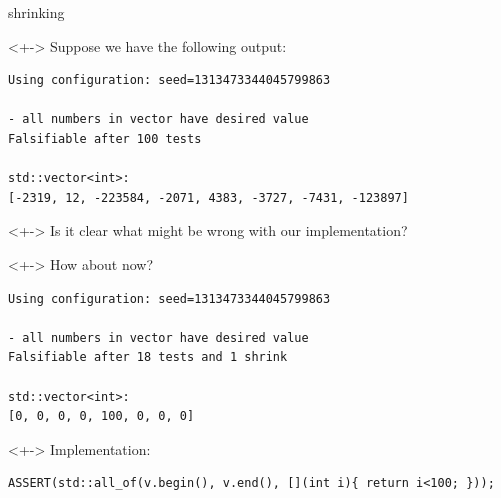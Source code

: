 \documentclass{beamer}
\begin{document}



\begin{frame}[fragile]{shrinking}

\begin{uncoverenv}<+->
Suppose we have the following output:
\begin{lstlisting}[style=shell]
Using configuration: seed=1313473344045799863

- all numbers in vector have desired value
Falsifiable after 100 tests

std::vector<int>:
[-2319, 12, -223584, -2071, 4383, -3727, -7431, -123897]
\end{lstlisting}
\end{uncoverenv}

\begin{uncoverenv}<+->
Is it clear what might be wrong with our implementation?
\end{uncoverenv}

\begin{uncoverenv}<+->
How about now?
\begin{lstlisting}[style=shell]
Using configuration: seed=1313473344045799863

- all numbers in vector have desired value
Falsifiable after 18 tests and 1 shrink

std::vector<int>:
[0, 0, 0, 0, 100, 0, 0, 0]
\end{lstlisting}
\end{uncoverenv}

\begin{uncoverenv}<+->
Implementation:
\begin{lstlisting}[style=cpp]
ASSERT(std::all_of(v.begin(), v.end(), [](int i){ return i<100; }));
\end{lstlisting}
\end{uncoverenv}

\end{frame}



\end{document}
